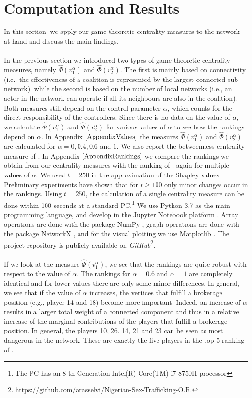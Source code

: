 \documentclass[10p]{article}
\theoremstyle{definition}
\theoremstyle{definition}
\begin{document}
\section{Computation and Results}
In this section, we apply our game theoretic centrality measures to the network at hand and discuss the main findings. \\ \\
In the previous section we introduced two types of game theoretic centrality measures, namely $\hat{\Phi}(v_1^\alpha)$ and $\hat{\Phi}(v_2^\alpha)$. The first is mainly based on connectivity (i.e., the effectiveness of a coalition is represented by the largest connected sub-network), while the second is based on the number of local networks (i.e., an actor in the network can operate if all its neighbours are also in the coalition). Both measures still depend on the control parameter $\alpha$, which counts for the direct responsibility of the controllers. Since there is no data on the value of $\alpha$, we calculate $\hat{\Phi}(v_1^\alpha)$ and $\hat{\Phi}(v_2^\alpha)$ for various values of $\alpha$ to see how the rankings depend on $\alpha$. In Appendix $\ref{AppendixValues}$ the measures $\hat{\Phi}(v_1^\alpha)$ and $\hat{\Phi}(v_2^\alpha)$ are calculated for $\alpha = 0, 0.4, 0.6$ and $1$. We also report the betweenness centrality measure of \cite{mancuso2014not}. In Appendix $\ref{AppendixRankings}$ we compare the rankings we obtain from our centrality measures with the ranking of \cite{mancuso2014not}, again for multiple values of $\alpha$. We used $t = 250$ in the approximation of the Shapley values. Preliminary experiments have shown that for $t \geq 100$ only minor changes occur in the rankings. Using $t = 250$, the calculation of a single centrality measure can be done within 100 seconds at a standard PC.\footnote{The PC has an 8-th Generation Intel(R) Core(TM) i7-8750H processor}  We use Python 3.7 \cite{Rossum:1995:PRM:869369} as the main programming language, and develop in the Jupyter Notebook platform \cite{Kluyver:2016aa}. Array operations are done with the package NumPy \cite{numpy}, graph operations are done with the package NetworkX \cite{team2014networkx}, and for the visual plotting we use Matplotlib \cite{Hunter:2007}. The project repository is publicly available on \textit{GitHub}\footnote{\url{https://github.com/arasselvi/Nigerian-Sex-Trafficking-O.R.}}. \\ \\
If we look at the measure $\hat{\Phi}(v_1^\alpha)$, we see that the rankings are quite robust with respect to the value of $\alpha$. The rankings for $\alpha = 0.6$ and $\alpha = 1$ are completely identical and for lower values there are only some minor differences. In general, we see that if the value of $\alpha$ increases, the vertices that fulfill a brokerage position (e.g., player 14 and 18) become more important. Indeed, an increase of $\alpha$ results in a larger total weight of a connected component and thus in a relative increase of the marginal contributions of the players that fulfill a brokerage position. In general, the players 10, 26, 14, 21 and 23 can be seen as most dangerous in the network. These are exactly the five players in the top 5 ranking of \cite{mancuso2014not}. 
\end{document}

